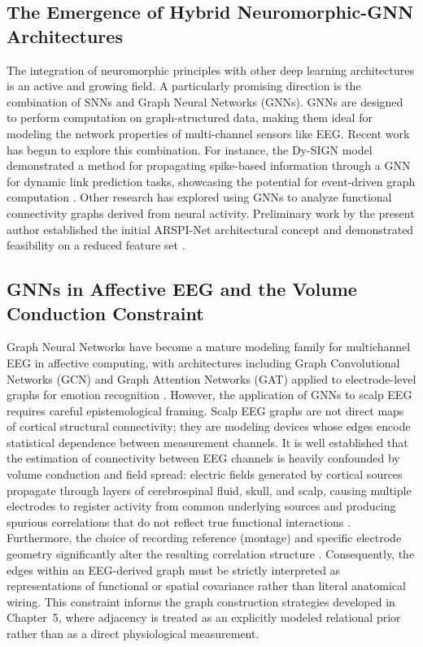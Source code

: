 \subsection{The Emergence of Hybrid Neuromorphic-GNN Architectures}
The integration of neuromorphic principles with other deep learning architectures is an active and growing field. A particularly promising direction is the combination of SNNs and Graph Neural Networks (GNNs). GNNs are designed to perform computation on graph-structured data, making them ideal for modeling the network properties of multi-channel sensors like EEG. Recent work has begun to explore this combination. For instance, the Dy-SIGN model demonstrated a method for propagating spike-based information through a GNN for dynamic link prediction tasks, showcasing the potential for event-driven graph computation \cite{Yoon2024DySIGN}. Other research has explored using GNNs to analyze functional connectivity graphs derived from neural activity. Preliminary work by the present author established the initial ARSPI-Net architectural concept and demonstrated feasibility on a reduced feature set \cite{lane_arspi_2024}.

\subsection{GNNs in Affective EEG and the Volume Conduction Constraint}
\label{sec:volume_conduction}
Graph Neural Networks have become a mature modeling family for multichannel EEG in affective computing, with architectures including Graph Convolutional Networks (GCN) and Graph Attention Networks (GAT) applied to electrode-level graphs for emotion recognition \cite{Jia2024GNNEEGSentiment}. However, the application of GNNs to scalp EEG requires careful epistemological framing. Scalp EEG graphs are not direct maps of cortical structural connectivity; they are modeling devices whose edges encode statistical dependence between measurement channels. It is well established that the estimation of connectivity between EEG channels is heavily confounded by volume conduction and field spread: electric fields generated by cortical sources propagate through layers of cerebrospinal fluid, skull, and scalp, causing multiple electrodes to register activity from common underlying sources and producing spurious correlations that do not reflect true functional interactions \cite{nunez_srinivasan_2006}. Furthermore, the choice of recording reference (montage) and specific electrode geometry significantly alter the resulting correlation structure \cite{yao_2001}. Consequently, the edges within an EEG-derived graph must be strictly interpreted as representations of functional or spatial covariance rather than literal anatomical wiring. This constraint informs the graph construction strategies developed in Chapter~5, where adjacency is treated as an explicitly modeled relational prior rather than as a direct physiological measurement.

